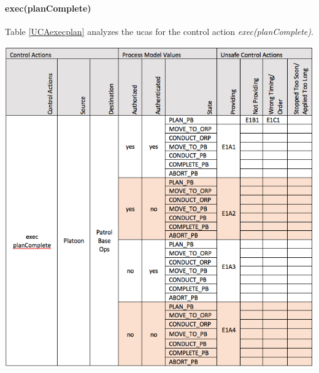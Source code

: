 \documentclass[../../main/main.tex]{subfiles}
\begin{document}
\clearpage
\paragraph*{exec(planComplete)}
Table \ref{UCAexecplan} analyzes the \glspl{uca} for the control action \textit{exec(planComplete)}.

\begin{table}[ht!]
\begin{center}
\includegraphics[width=\linewidth]{../figures/UCAexecplan}
\caption{Unsafe control actions \glspl{uca} for control action "exec(planComplete)."}
\label{UCAexecplan}
\end{center}
\end{table}

\clearpage
\end{document}
